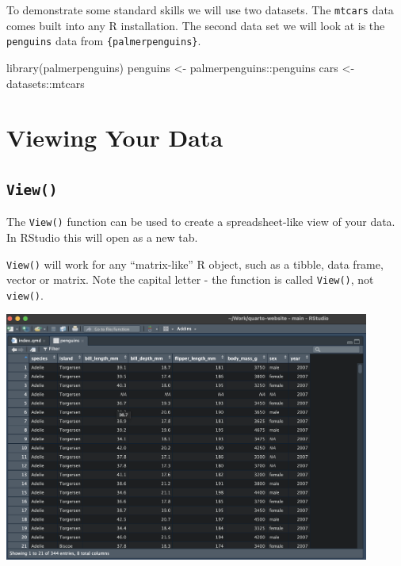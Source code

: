 \documentclass[
  letterpaper,
  DIV=11,
  numbers=noendperiod]{scrreprt}
\newenvironment{Shaded}{\begin{snugshade}}{\end{snugshade}}
\newcommand{\FunctionTok}[1]{\textcolor[rgb]{0.28,0.35,0.67}{#1}}
\newcommand{\NormalTok}[1]{\textcolor[rgb]{0.00,0.23,0.31}{#1}}
\newcommand{\OtherTok}[1]{\textcolor[rgb]{0.00,0.23,0.31}{#1}}
\newcommand{\SpecialCharTok}[1]{\textcolor[rgb]{0.37,0.37,0.37}{#1}}
\begin{document}
To demonstrate some standard skills we will use two datasets. The
\texttt{mtcars} data comes built into any R installation. The second
data set we will look at is the \texttt{penguins} data from
\texttt{\{palmerpenguins\}}.

\begin{Shaded}
\begin{Highlighting}[]
\FunctionTok{library}\NormalTok{(palmerpenguins)}
\NormalTok{penguins }\OtherTok{\textless{}{-}}\NormalTok{ palmerpenguins}\SpecialCharTok{::}\NormalTok{penguins}
\NormalTok{cars }\OtherTok{\textless{}{-}}\NormalTok{ datasets}\SpecialCharTok{::}\NormalTok{mtcars}
\end{Highlighting}
\end{Shaded}

\section{Viewing Your Data}\label{viewing-your-data}

\subsection{\texorpdfstring{\texttt{View()}}{View()}}\label{view}

The \texttt{View()} function can be used to create a spreadsheet-like
view of your data. In RStudio this will open as a new tab.

\texttt{View()} will work for any ``matrix-like'' R object, such as a
tibble, data frame, vector or matrix. Note the capital letter - the
function is called \texttt{View()}, not \texttt{view()}.

\begin{center}
\includegraphics[width=0.9\textwidth,height=\textheight]{images/301-edav-wrangling/view-penguins-screenshot.png}
\end{center}
\end{document}
